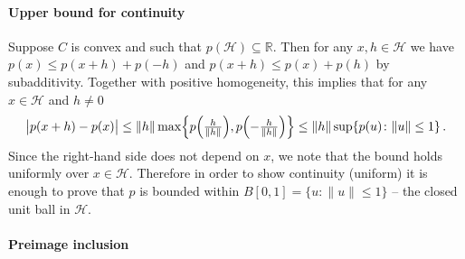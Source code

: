 \documentclass[a4paper]{article}
\newcommand{\Hcal}{\mathcal{H}}
\newcommand{\real}{\mathbb{R}}
\begin{document}

\paragraph{Upper bound for continuity} %
\label{par:upper_bound_for_continuity}

Suppose $C$ is convex and such that $p(\Hcal)\subseteq \real$. Then for any $x, h
\in \Hcal$ we have $p(x) \leq p(x+h) + p(-h)$ and $p(x + h) \leq p(x) + p(h)$ by
subadditivity. Together with positive homogeneity, this implies that for any $x \in
\Hcal$ and $h\neq 0$
\begin{equation*}
  \bigl\lvert p(x + h) - p(x) \bigr\rvert
    \leq \| h \| \max\Bigl\{
        p\Bigl(\tfrac{h}{\|h\|}\Bigr),
        p\Bigl(- \tfrac{h}{\|h\|}\Bigr)
      \Bigr\}
    \leq \| h \| \sup \{p(u)\colon \|u\|\leq 1\}
    \,.
\end{equation*}
Since the right-hand side does not depend on $x$, we note that the bound holds
uniformly over $x \in \Hcal$. Therefore in order to show continuity (uniform) it
is enough to prove that $p$ is bounded within $B[0, 1] = \{u\colon \|u\| \leq 1\}$
-- the closed unit ball in $\Hcal$.


\paragraph{Preimage inclusion} %
\label{par:preimage_inclusion}
\end{document}
